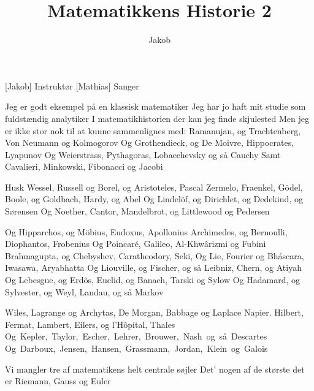 \documentclass[a4paper,11pt]{article}
\title{Matematikkens Historie 2}
\author{Jakob}
\begin{document}
\maketitle

\begin{roles}
[Jakob] Instruktør
[Mathias] Sanger
\end{roles}

\begin{song}
   Jeg er godt eksempel på en klassisk matematiker
Jeg har jo haft mit studie som fuldstændig analytiker
I matematikhistorien der kan jeg finde skjulested
Men jeg er ikke stor nok til at kunne sammenlignes med:
Ramanujan, og Trachtenberg, Von Neumann og Kolmogorov
Og Grothendieck, og De Moivre, Hippocrates, Lyapunov
Og Weierstrass, Pythagoras, Lobaechevsky og så Cauchy
Samt Cavalieri, Minkowski, Fibonacci og Jacobi 

 Husk Wessel, Russell og Borel, og Aristoteles, Pascal
Zermelo, Fraenkel, Gödel, Boole, og Goldbach, Hardy, og Abel
Og Lindelöf, og Dirichlet, og Dedekind, og Sørensen
Og Noether, Cantor, Mandelbrot, og Littlewood og Pedersen 

Og Hipparchos, og Möbius, Eudoxus, Apollonius
Archimedes, og Bernoulli, Diophantos, Frobenius
Og Poincaré, Galileo, Al-Khwârizmi og Fubini
Brahmagupta, og Chebyshev, Caratheodory, Seki,
Og Lie, Fourier og Bháscara, Iwasawa, Aryabhatta
Og Liouville, og Fischer, og så Leibniz, Chern, og Atiyah
Og Lebesgue, og Erdõs, Euclid, og Banach, Tarski og Sylow
Og Hadamard, og Sylvester, og Weyl, Landau, og så Markov


Wiles, Lagrange og Archytas, De Morgan, Babbage og Laplace
Napier. Hilbert, Fermat, Lambert, Eilers, og l'Hôpital, Thales
\mbox{Og Kepler, Taylor, Escher, Lehrer, Brouwer, Nash og så Descartes}
\mbox{Og Darboux, Jensen, Hansen, Grassmann, Jordan, Klein og Galois}

Vi mangler tre af matematikens helt centrale søjler
Det' nogen af de største det er Riemann, Gauss og Euler

\end{song}
\end{document}
